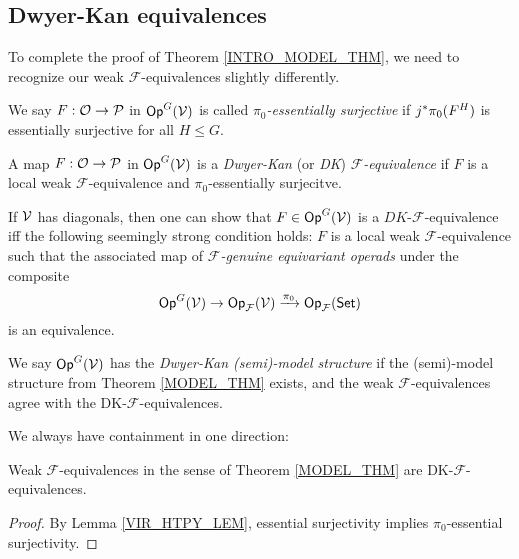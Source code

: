 \documentclass[a4paper,10pt
,draft
]{article}%
\renewcommand{\F}{\mathcal F}
\renewcommand{\1}{\eta}%
\begin{document}
\subsection{Dwyer-Kan equivalences}
\label{DK_SEC}

To complete the proof of Theorem \ref{INTRO_MODEL_THM}, 
we need to recognize our weak $\F$-equivalences slightly differently.

\begin{definition}
      We say $F: \mathcal{O} \to \mathcal{P}$ in $\mathsf{Op}^G(\mathcal V)$ is called \textit{$\pi_0$-essentially surjective} if
      $j^{\**}\pi_0(F^H)$ is essentially surjective for all $H \leq G$.
      
      A map $F: \mathcal{O} \to \mathcal{P}$ in $\mathsf{Op}^G(\mathcal V)$ is a \textit{Dwyer-Kan} (or \textit{DK}) \textit{$\F$-equivalence} if
      $F$ is a local weak $\F$-equivalence and $\pi_0$-essentially surjecitve.
\end{definition}

\begin{remark}
      If $\mathcal V$ has diagonals, then one can show that $F \in \mathsf{Op}^G(\mathcal V)$ is a $DK$-$\F$-equivalence iff
      the following seemingly strong condition holds:
      $F$ is a local weak $\F$-equivalence such that 
      the associated map of \textit{$\F$-genuine equivariant operads} under the composite
      \begin{equation}
            \Op^G(\V) \to \Op_\F(\V) \xrightarrow{\pi_0} \Op_\F(\Set) 
      \end{equation}
      is an equivalence.
\end{remark}

\begin{definition}
      \label{DK_MODEL_DEF}
      We say $\mathsf{Op}^G(\mathcal V)$ has the \textit{Dwyer-Kan (semi)-model structure} if the (semi)-model structure from
      Theorem \ref{MODEL_THM} exists, and the weak $\F$-equivalences agree with the DK-$\F$-equivalences.
\end{definition}

We always have containment in one direction:
\begin{proposition}
      \label{WE_ARE_DK_PROP}
      Weak $\F$-equivalences in the sense of Theorem \ref{MODEL_THM} are DK-$\F$-equivalences.
\end{proposition}
\begin{proof}
      By Lemma \ref{VIR_HTPY_LEM}, essential surjectivity implies $\pi_0$-essential surjectivity. 
\end{proof}
\end{document}
